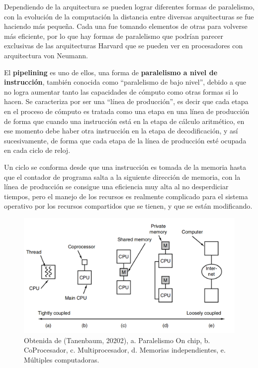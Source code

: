 \documentclass[letterpaper,12pt,oneside]{book}
\begin{document}
        Dependiendo de la arquitectura se pueden lograr diferentes formas de paralelismo,
		con la evolución de la computación la distancia entre diversas arquitecturas se fue haciendo más pequeña. Cada una fue tomando
		elementos de otras para volverse más eficiente, por lo que hay formas de paralelismo que podrían parecer exclusivas de las arquitecturas
		Harvard  que se pueden ver en procesadores con arquitectura von Neumann\cite{null_essentials_2003}.
  
        El \textbf{pipelining} es uno de ellos, una forma de \textbf{paralelismo
		a nivel de instrucción}, también conocida como ``paralelismo de bajo nivel'', debido a que no logra aumentar tanto las capacidades
		de cómputo como otras formas si lo hacen. Se caracteriza por ser una ``línea de producción'', es decir que cada etapa en el proceso de cómputo es 
		tratada
		como una etapa en una línea de producción de forma que cuando una instrucción está en la etapa de cálculo aritmético, en ese momento
		debe haber otra instrucción en la etapa de decodificación, y así sucesivamente, de forma que cada etapa de la línea de producción
		esté ocupada en cada ciclo de reloj\cite[p.421]{null_essentials_2003}. 
  
        Un ciclo se conforma desde que una instrucción es tomada de la memoria hasta que el contador
		de programa salta a la siguiente dirección de memoria, con la línea de producción se consigue una eficiencia muy alta al no desperdiciar tiempos, pero el manejo de los recursos es realmente complicado para el sistema operativo por los recursos compartidos que
		se tienen, y que se están modificando\cite[p.421]{null_essentials_2003}.
		
		\begin{figure}[h]
 			\centering
			\includegraphics[scale=0.3]{media/ParalelismoTanenbaun.png}
			\caption{Obtenida de (Tanenbaum, 20202), a. Paralelismo On chip, b. CoProcesador, c. Multiprocesador, d. Memorias independientes, e. Múltiples computadoras.}%
			\label{fig:Paralelismo}
		\end{figure}
		
\end{document}
